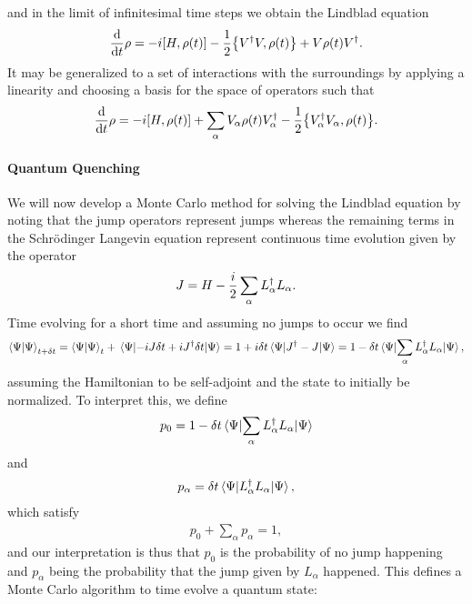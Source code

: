 and in the limit of infinitesimal time steps we obtain the Lindblad equation
\begin{align*}
	\dv{t}\rho = -i\comm{H}{\rho(t)} - \frac{1}{2}\acomm{V\adj V}{\rho(t)} + V\rho(t)V\adj.
\end{align*}
It may be generalized to a set of interactions with the surroundings by applying a linearity and choosing a basis for the space of operators such that
\begin{align*}
	\dv{t}\rho = -i\comm{H}{\rho(t)} + \sum\limits_{\alpha}V_{\alpha}\rho(t)V_{\alpha}\adj - \frac{1}{2}\acomm{V_{\alpha}\adj V_{\alpha}}{\rho(t)}.
\end{align*}

\paragraph{Quantum Quenching}
We will now develop a Monte Carlo method for solving the Lindblad equation by noting that the jump operators represent jumps whereas the remaining terms in the Schrödinger Langevin equation represent continuous time evolution given by the operator
\begin{align*}
	J = H - \frac{i}{2}\sum\limits_{\alpha}L_{\alpha}^{\dagger} L_{\alpha}.
\end{align*}
Time evolving for a short time and assuming no jumps to occur we find
\begin{align*}
	\braket{\Psi}_{t + \delta t} = \braket{\Psi}_{t} + \expval{-iJ\delta t + iJ\ensuremath{^{\dagger}}\delta t}{\Psi} = 1 + i\delta t\expval{J\ensuremath{^{\dagger}}- J}{\Psi} = 1 - \delta t\expval{\sum\limits_{\alpha}L_{\alpha}\ensuremath{^{\dagger}}L_{\alpha}}{\Psi},
\end{align*}
assuming the Hamiltonian to be self-adjoint and the state to initially be normalized. To interpret this, we define
\begin{align*}
	p_{0} = 1 - \delta t\expval{\sum\limits_{\alpha}L_{\alpha}\ensuremath{^{\dagger}}L_{\alpha}}{\Psi}
\end{align*}
and
\begin{align*}
	p_{\alpha} = \delta t\expval{L_{\alpha}\ensuremath{^{\dagger}}L_{\alpha}}{\Psi},
\end{align*}
which satisfy
\begin{align*}
	p_{0} + \sum\limits_{\alpha}p_{\alpha} = 1,
\end{align*}
and our interpretation is thus that $p_{0}$ is the probability of no jump happening and $p_{\alpha}$ being the probability that the jump given by $L_{\alpha}$ happened. This defines a Monte Carlo algorithm to time evolve a quantum state:
